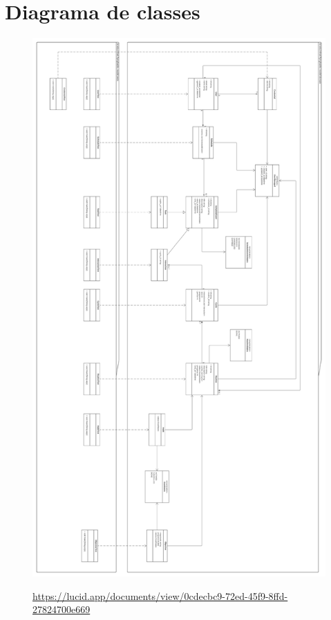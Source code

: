 \chapter{Diagrama de classes}

\begin{figure}[h]
  \centering
  \includegraphics[scale=0.5]{images/diagrams/classes.png}

  \url{https://lucid.app/documents/view/0cdecbc9-72ed-45f9-8ffd-27824700e669}
\end{figure}

